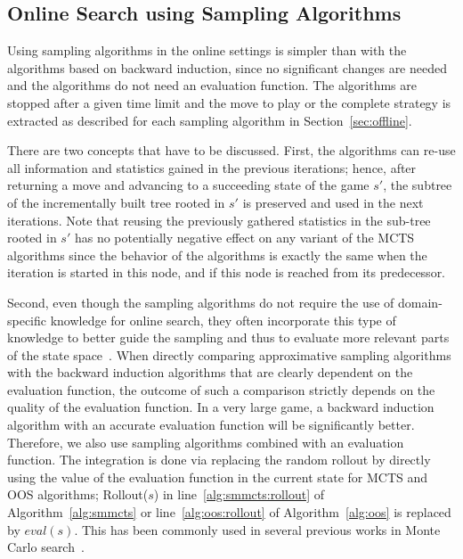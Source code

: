 \subsection{Online Search using Sampling Algorithms}

Using sampling algorithms in the online settings is simpler than with the algorithms based on backward induction, since no significant changes are needed and the algorithms do not need an evaluation function.
The algorithms are stopped after a given time limit and the move to play or the complete strategy is extracted as described for each sampling algorithm in Section~\ref{sec:offline}.

There are two concepts that have to be discussed.
First, the algorithms can re-use all information and statistics gained in the previous iterations; hence, after returning a move and advancing to a succeeding state of the game $s'$, the subtree of the incrementally built tree rooted in $s'$ is preserved and used in the next iterations.
Note that reusing the previously gathered statistics in the sub-tree rooted in $s'$ has no potentially negative effect on any variant of the MCTS algorithms since the behavior of the algorithms is exactly the same when the iteration is started in this node, and if this node is reached from its predecessor. 

Second, even though the sampling algorithms do not require the use of domain-specific knowledge for online search, they often incorporate this type of knowledge to better guide the sampling and thus to evaluate more relevant parts of the state space~\cite{Gelly07Combining,Lorentz08Amazons,Winands10MCTS-LOA,Lorentz13Breakthrough,Lanctot14Implicit}. When directly comparing approximative sampling algorithms with the backward induction algorithms that are clearly dependent on the evaluation function, the outcome of such a comparison strictly depends on the quality of the evaluation function. In a very large game, a backward induction algorithm with an accurate evaluation function will be significantly better. %
Therefore, we also use sampling algorithms combined with an evaluation function. The integration is done via replacing the random rollout
by directly using the value of the evaluation function in the current state for MCTS and OOS algorithms; \ie Rollout($s$) in
line~\ref{alg:smmcts:rollout} of Algorithm~\ref{alg:smmcts} or line~\ref{alg:oos:rollout} of Algorithm~\ref{alg:oos} is replaced by $eval(s)$.
This has been commonly used in several previous works in Monte Carlo search~\cite{Lorentz08Amazons,Lorentz13Breakthrough,Lanctot14Implicit,RamanujanS11,Lanctot13MCMS}.

